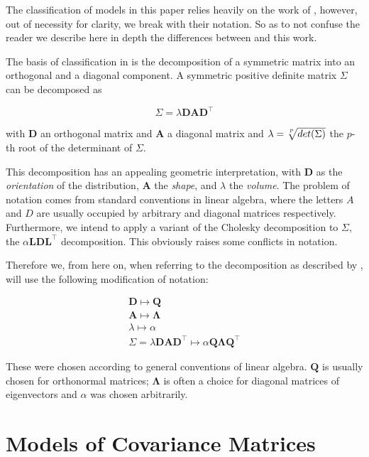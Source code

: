 The classification of models in this paper relies heavily on the work of 
\cite{Cel95}, however, out of necessity for clarity, we break with their 
notation. So as to not confuse the reader we describe here in depth the 
differences between \cite{Cel95} and this work.

The basis of classification in \cite{Cel95} is the decomposition of a
symmetric matrix into an orthogonal and a diagonal component.
A symmetric positive definite matrix $\Sigma$ can be decomposed as

\begin{equation} 
    \Sigma = \lambda \pmb{D} \pmb{A} \pmb{D}^{\top}
\end{equation}

with $\pmb{D}$ an orthogonal matrix and $\pmb{A}$ a diagonal matrix and
$\lambda = \sqrt[\uproot{3}p]{det(\Sigma)}$ the $p$-th root of the determinant 
of $ \Sigma $.

This decomposition has an appealing geometric interpretation, with $ \pmb{D} $ 
as the \textit{orientation} of the distribution, $ \pmb{A} $ the \textit{shape},
and $ \lambda $ the \textit{volume}. The problem of notation comes from standard 
conventions in linear algebra, where the letters $A$ and $D$ are usually 
occupied by arbitrary and diagonal matrices respectively. Furthermore, we intend
to apply a variant of the Cholesky decomposition to $ \Sigma $, the 
$ \alpha\pmb{L}\pmb{D}\pmb{L}^{\top} $ decomposition. This obviously raises some
conflicts in notation.

Therefore we, from here on, when referring to the decomposition as described by 
\cite{Cel95}, will use the following modification of notation:

\begin{gather} 
    \pmb{D} \longmapsto \pmb{Q} \\
    \pmb{A} \longmapsto \pmb{\Lambda} \\
    \lambda \longmapsto \alpha  \\
    \Sigma = \lambda \pmb{D} \pmb{A} \pmb{D}^\top \longmapsto
        \alpha \pmb{Q} \pmb{\Lambda} \pmb{Q}^\top
\end{gather}

These were chosen according to general conventions of linear algebra. $ \pmb{Q} $
is usually chosen for orthonormal matrices; $ \pmb{\Lambda} $ is often a choice 
for diagonal matrices of eigenvectors and $ \alpha $ was chosen arbitrarily.


\section{Models of Covariance Matrices}
\label{sec:models}

